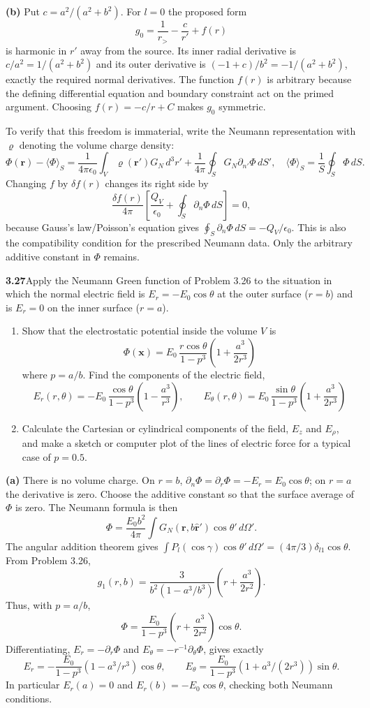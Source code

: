 \textbf{(b)} Put $c=a^2/(a^2+b^2)$.  For $l=0$ the proposed form
\[
g_0=\frac1{r_>}-\frac c{r'}+f(r)
\]
is harmonic in $r'$ away from the source.  Its inner radial derivative
is $c/a^2=1/(a^2+b^2)$ and its outer derivative is
$(-1+c)/b^2=-1/(a^2+b^2)$, exactly the required normal derivatives.
The function $f(r)$ is arbitrary because the defining differential
equation and boundary constraint act on the primed argument.
Choosing $f(r)=-c/r+C$ makes $g_0$ symmetric.

To verify that this freedom is immaterial, write the Neumann
representation with $\varrho$ denoting the volume charge density:
\[
\Phi(\mathbf r)-\langle\Phi\rangle_S
=\frac1{4\pi\epsilon_0}\int_V\varrho(\mathbf r')G_N\,d^3r'
+\frac1{4\pi}\oint_SG_N\partial_{n'}\Phi\,dS',
\quad\langle\Phi\rangle_S=\frac1S\oint_S\Phi\,dS.
\]
Changing $f$ by $\delta f(r)$ changes its right side by
\[
\frac{\delta f(r)}{4\pi}
\left[\frac{Q_V}{\epsilon_0}+\oint_S\partial_n\Phi\,dS\right]=0,
\]
because Gauss's law/Poisson's equation gives
$\oint_S\partial_n\Phi\,dS=-Q_V/\epsilon_0$.
This is also the compatibility condition for the prescribed Neumann
data.  Only the arbitrary additive constant in $\Phi$ remains.

\par\bigskip
\noindent\textbf{3.27}\quad Apply the Neumann Green function of Problem 3.26 to the situation in which the normal electric field is $E_{r}=-E_{0}\cos\theta$ at the outer surface ($r=b$) and is $E_{r}=0$ on the inner surface ($r=a$).
\begin{enumerate}
\item[(a)] Show that the electrostatic potential inside the volume $V$ is
\[
\Phi(\mathbf{x})=E_{0}\,\frac{r\cos\theta}{1-p^{3}}\left(1+\frac{a^{3}}{2r^{3}}\right)
\]
where $p=a/b$. Find the components of the electric field,
\[
E_{r}(r,\theta)=-E_{0}\,\frac{\cos\theta}{1-p^{3}}\left(1-\frac{a^{3}}{r^{3}}\right),\qquad
E_{\theta}(r,\theta)=E_{0}\,\frac{\sin\theta}{1-p^{3}}\left(1+\frac{a^{3}}{2r^{3}}\right)
\]
\item[(b)] Calculate the Cartesian or cylindrical components of the field, $E_{z}$ and $E_{\rho}$, and make a sketch or computer plot of the lines of electric force for a typical case of $p=0.5$.
\end{enumerate}
\solution

\textbf{(a)} There is no volume charge.  On $r=b$,
$\partial_n\Phi=\partial_r\Phi=-E_r=E_0\cos\theta$;
on $r=a$ the derivative is zero.  Choose the additive constant so
that the surface average of $\Phi$ is zero.  The Neumann formula is
then
\[
\Phi=\frac{E_0b^2}{4\pi}\int G_N(\mathbf r,b\hat{\mathbf r}')
\cos\theta'\,d\Omega'.
\]
The angular addition theorem gives
$\int P_l(\cos\gamma)\cos\theta'\,d\Omega'
=(4\pi/3)\delta_{l1}\cos\theta$.  From Problem 3.26,
\[
g_1(r,b)=\frac{3}{b^2(1-a^3/b^3)}
\left(r+\frac{a^3}{2r^2}\right).
\]
Thus, with $p=a/b$,
\[
\boxed{\Phi=\frac{E_0}{1-p^3}\left(r+\frac{a^3}{2r^2}\right)
\cos\theta.}
\]
Differentiating, $E_r=-\partial_r\Phi$ and
$E_\theta=-r^{-1}\partial_\theta\Phi$, gives exactly
\[
E_r=-\frac{E_0}{1-p^3}(1-a^3/r^3)\cos\theta,\qquad
E_\theta=\frac{E_0}{1-p^3}(1+a^3/(2r^3))\sin\theta.
\]
In particular $E_r(a)=0$ and $E_r(b)=-E_0\cos\theta$, checking
both Neumann conditions.

